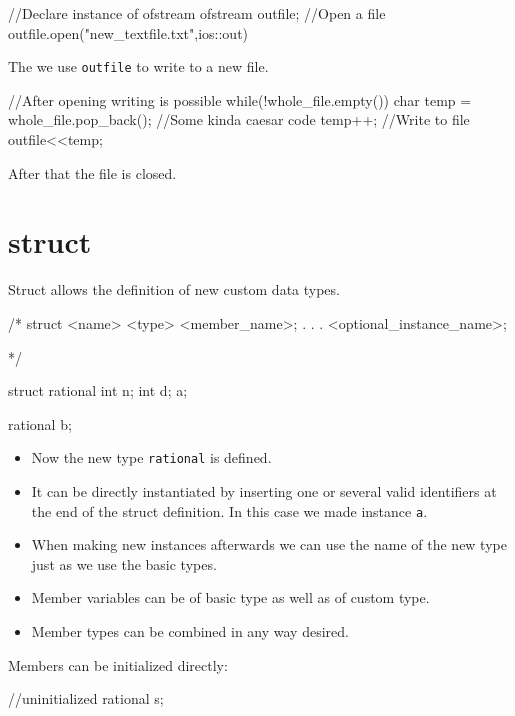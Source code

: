 \documentclass[10pt,a4paper]{scrartcl}
\begin{document}
\begin{multicols*}{2}
\begin{TPCpp}
	//Declare instance of ofstream
	ofstream outfile;
	//Open a file 	outfile.open("new_textfile.txt",ios::out)
\end{TPCpp}

The we use \verb+outfile+ to write to a new file.

\begin{TPCpp}
	//After opening writing is possible
	while(!whole_file.empty()){
		char temp = whole_file.pop_back();
		//Some kinda caesar code
		temp++;
		//Write to file
		outfile<<temp;
	}	
\end{TPCpp}

After that the file is closed.

\begin{TPCpp}
	outfile.close();
	return 0;
}
\end{TPCpp}

\section{struct}

Struct allows the definition of new custom data types.

\begin{TPCpp}
/* 
struct <name> {
	<type> <member_name>;
	.
	.
	.
}<optional_instance_name>;

*/

struct rational{
	int n;
	int d;
}a;

rational b;
\end{TPCpp}

\begin{itemize}
\item Now the new type \verb+rational+ is defined.
\item It can be directly instantiated by inserting one or several valid identifiers at the end of the struct definition. In this case we made instance \verb+a+.
\item When making new instances afterwards we can use the name of the new type just as we use the basic types.
\item Member variables can be of basic type as well as of custom type.
\item Member types can be combined in any way desired.
\end{itemize}

Members can be initialized directly:

\begin{TPCpp}
//uninitialized
rational s;


\end{TPCpp}
\end{multicols*}
\end{document}
